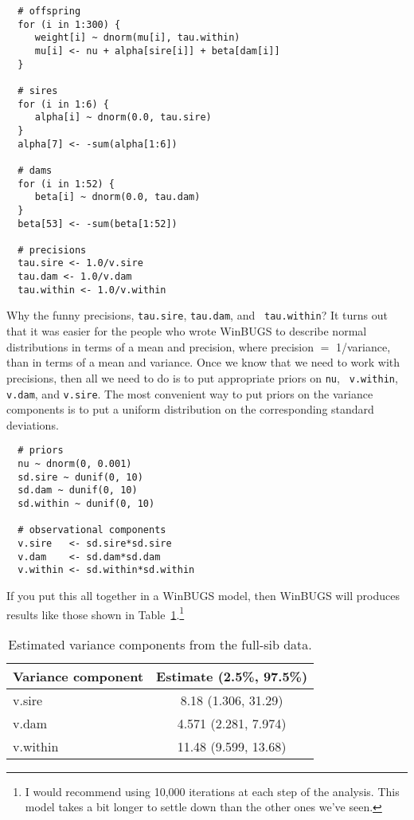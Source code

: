 \documentclass[12pt]{article}
\begin{document}
\begin{verbatim}
  # offspring
  for (i in 1:300) {
     weight[i] ~ dnorm(mu[i], tau.within)
     mu[i] <- nu + alpha[sire[i]] + beta[dam[i]]
  }

  # sires
  for (i in 1:6) {
     alpha[i] ~ dnorm(0.0, tau.sire)
  }
  alpha[7] <- -sum(alpha[1:6])

  # dams
  for (i in 1:52) {
     beta[i] ~ dnorm(0.0, tau.dam)
  }
  beta[53] <- -sum(beta[1:52])

  # precisions
  tau.sire <- 1.0/v.sire
  tau.dam <- 1.0/v.dam
  tau.within <- 1.0/v.within
\end{verbatim}

Why the funny precisions, {\tt tau.sire}, {\tt tau.dam}, and {\tt
  tau.within}? It turns out that it was easier for the people who
wrote WinBUGS to describe normal distributions in terms of a mean and
precision, where precision $=$ 1/variance, than in terms of a mean and
variance. Once we know that we need to work with precisions, then all
we need to do is to put appropriate priors on {\tt nu}, {\tt
  v.within}, {\tt v.dam}, and {\tt v.sire}. The most convenient way to
put priors on the variance components is to put a uniform distribution
on the corresponding standard deviations.

\begin{verbatim}
  # priors
  nu ~ dnorm(0, 0.001)
  sd.sire ~ dunif(0, 10)
  sd.dam ~ dunif(0, 10)
  sd.within ~ dunif(0, 10)

  # observational components
  v.sire   <- sd.sire*sd.sire
  v.dam    <- sd.dam*sd.dam
  v.within <- sd.within*sd.within
\end{verbatim}

If you put this all together in a WinBUGS model, then
WinBUGS will produces results like those shown in
Table~\ref{table:results}.\footnote{I would recommend using 10,000
iterations at each step of the analysis. This model takes a bit
longer to settle down than the other ones we've seen.}

\begin{table}
\begin{center}
\begin{tabular}{lc}
\hline\hline
Variance component & Estimate (2.5\%, 97.5\%) \\
\hline
v.sire   & 8.18 (1.306, 31.29) \\
v.dam    & 4.571 (2.281, 7.974) \\
v.within & 11.48 (9.599, 13.68) \\
\hline
\end{tabular}
\end{center}
\caption{Estimated variance components from the full-sib
data.}\label{table:results}
\end{table}

\ccLicense
\end{document}
